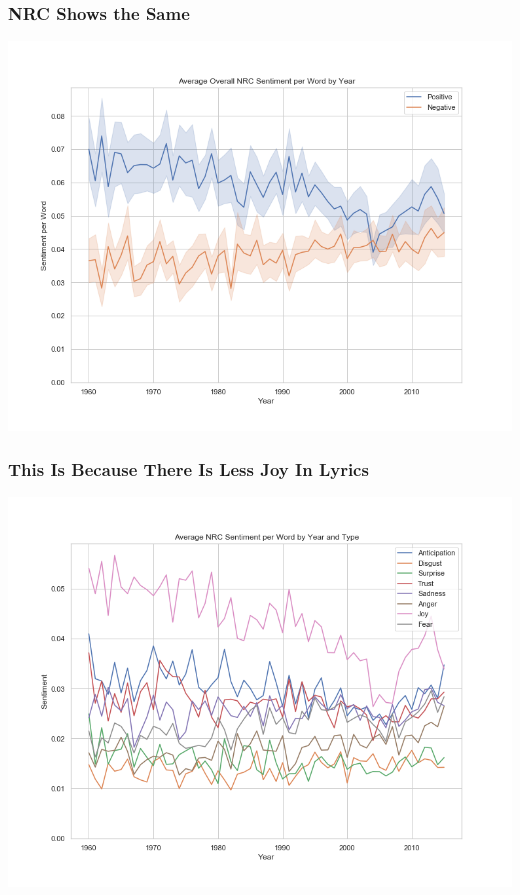 \documentclass[10pt]{beamer}
\begin{document}
\begin{frame}
\frametitle{NRC Shows the Same}

{
    \centering
    \includegraphics[width=\textwidth, height=\textheight,keepaspectratio]{average_nrc_emotions_overall_by_year.png}
    \par
}

\end{frame}

\begin{frame}
\frametitle{This Is Because There Is Less Joy In Lyrics}

{
    \centering
    \includegraphics[width=\textwidth, height=\textheight,keepaspectratio]{average_nrc_sentiment_by_year.png}
    \par
}

\end{frame}
\end{document}
